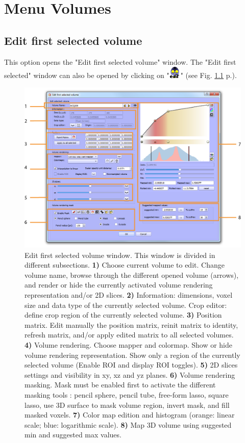 
\chapter{Menu Volumes}\label{volumes_chapter}
\minitoc 

\section{Edit first selected volume}
This option opens the "Edit first selected volume" window.
The "Edit first selected" window can also be opened by clicking on "\includegraphics[scale=0.7]{images/06/objects/volume_edit.png}" (see Fig. \ref{edit_volume_window} p.\pageref{edit_volume_window}).



\begin{figure}
  \centering
  \includegraphics[scale=1]{images/14/edit_volume_window.png}
\caption{Edit first selected volume window. This window is divided in different subsections. \textbf{1)} Choose current volume to edit. Change volume name, browse through the different opened volume (arrows), and render or hide the currently activated volume rendering representation and/or 2D slices.  \textbf{2)} Information: dimensions, voxel size and data type of the currently selected volume. Crop editor: define crop region of the currently selected volume. \textbf{3)} Position matrix. Edit manually the position matrix, reinit matrix to identity, refresh matrix, and/or apply edited matrix to all selected volumes. \textbf{4)} Volume rendering. Choose mapper and colormap. Show or hide volume rendering representation. Show only a region of the currently selected volume (Enable ROI and display ROI toggles). \textbf{5)} 2D slices settings and visibility in xy, xz and yz planes. \textbf{6)} Volume rendering masking. Mask must be enabled first to activate the different masking tools : pencil sphere, pencil tube, free-form lasso, square lasso, use 3D surface to mask volume region, invert mask, and fill masked voxels.  \textbf{7)} Color map edition and histogram (orange: linear scale; blue: logarithmic scale). \textbf{8)} Map 3D volume using suggested min and suggested max values.}	
\label{edit_volume_window}
 \end{figure}

